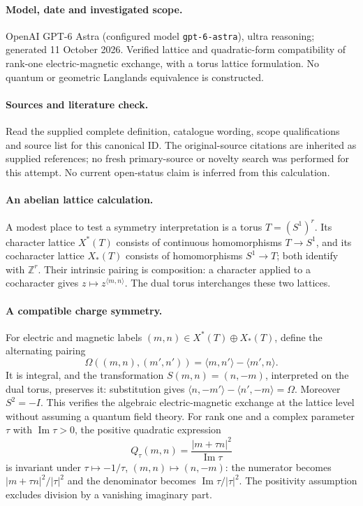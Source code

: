 \documentclass[11pt]{article}
\begin{document}
\paragraph{Model, date and investigated scope.}
OpenAI GPT-6 Astra (configured model \texttt{gpt-6-astra}), ultra reasoning; generated 11 October 2026. Verified lattice and quadratic-form compatibility of rank-one electric-magnetic exchange, with a torus lattice formulation. No quantum or geometric Langlands equivalence is constructed.

\paragraph{Sources and literature check.}
Read the supplied complete definition, catalogue wording, scope qualifications and source list for this canonical ID. The original-source citations are inherited as supplied references; no fresh primary-source or novelty search was performed for this attempt. No current open-status claim is inferred from this calculation.

\paragraph{An abelian lattice calculation.}A modest place to test a symmetry interpretation is a torus \(T=(S^1)^r\). Its character lattice \(X^*(T)\) consists of continuous homomorphisms \(T\to S^1\), and its cocharacter lattice \(X_*(T)\) consists of homomorphisms \(S^1\to T\); both identify with \(\mathbb Z^r\). Their intrinsic pairing is composition: a character applied to a cocharacter gives \(z\mapsto z^{\langle m,n\rangle}\). The dual torus interchanges these two lattices.
\paragraph{A compatible charge symmetry.}For electric and magnetic labels \((m,n)\in X^*(T)\oplus X_*(T)\), define the alternating pairing
\[\Omega((m,n),(m',n'))=\langle m,n'\rangle-\langle m',n\rangle.\]
It is integral, and the transformation \(S(m,n)=(n,-m)\), interpreted on the dual torus, preserves it: substitution gives \(\langle n,-m'\rangle-\langle n',-m\rangle=\Omega\). Moreover \(S^2=-I\). This verifies the algebraic electric-magnetic exchange at the lattice level without assuming a quantum field theory.
For rank one and a complex parameter \(\tau\) with \(\operatorname{Im}\tau>0\), the positive quadratic expression
\[Q_\tau(m,n)=\frac{|m+\tau n|^2}{\operatorname{Im}\tau}\]
is invariant under \(\tau\mapsto-1/\tau\), \((m,n)\mapsto(n,-m)\): the numerator becomes \(|m+\tau n|^2/|\tau|^2\) and the denominator becomes \(\operatorname{Im}\tau/|\tau|^2\). The positivity assumption excludes division by a vanishing imaginary part.
\end{document}
